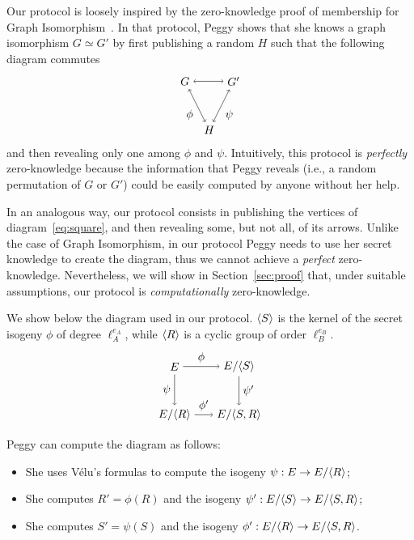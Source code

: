 Our protocol is loosely inspired by the zero-knowledge proof of
membership for Graph
Isomorphism~\cite{goldreich+micali+widgerson91}. In that protocol,
Peggy shows that she knows a graph isomorphism $G \simeq G'$ by first
publishing a random $H$ such that the following diagram commutes
\begin{equation}
  \label{eq:gi}
  \begin{tikzpicture}[xscale=1.5,yscale=1.5,baseline=(current bounding box.east)]
    \node(G) at (0,0) {$G$};
    \node(G') at (1,0) {$G'$};
    \node(H) at (0.5,-1) {$H$};
    \path[<->] (G) edge (G');
    \path[<->] (G) edge node[auto,swap] {$\phi$} (H);
    \path[<->] (G') edge node[auto] {$\psi$} (H);
  \end{tikzpicture}  
\end{equation}
and then revealing only one among $\phi$ and $\psi$. Intuitively, this
protocol is \emph{perfectly} zero-knowledge because the information
that Peggy reveals (i.e., a random permutation of $G$ or $G'$) could
be easily computed by anyone without her help.

In an analogous way, our protocol consists in publishing the vertices
of diagram~\eqref{eq:square}, and then revealing some, but not all, of
its arrows. Unlike the case of Graph Isomorphism, in our protocol
Peggy needs to use her secret knowledge to create the diagram, thus we
cannot achieve a \emph{perfect} zero-knowledge. Nevertheless, we will
show in Section~\ref{sec:proof} that, under suitable assumptions, our
protocol is \emph{computationally} zero-knowledge.

We show below the diagram used in our protocol. ${\langle S \rangle}$ is the
kernel of the secret isogeny $\phi$ of degree $\ell_A^{e_A}$, while
${\langle R \rangle}$ is a cyclic group of order $\ell_B^{e_B}$.
\begin{equation}
  \label{eq:zk}
  \begin{tikzpicture}[xscale=2,yscale=1.5,baseline=(current bounding box.east)]
    \node(0) at (0,0) {$E$};
    \node(S) at (1,0) {$E/\cyc{S}$};
    \node(R) at (0,-1) {$E/\cyc{R}$};
    \node(SR) at (1,-1) {$E/\cyc{S,R}$};
    \path[->] (0) edge node[auto] {$\phi$} (S);
    \path[->] (0) edge node[auto,swap] {$\psi$} (R);
    \path[->] (S) edge node[auto] {$\psi'$} (SR);
    \path[->] (R) edge node[auto] {$\phi'$} (SR);
  \end{tikzpicture}
\end{equation}

Peggy can compute the diagram as follows:
\begin{itemize}
\item She uses V\'elu's formulas to compute the isogeny $\psi:E\to
  E/{\langle R \rangle}$;
\item She computes $R' = \phi(R)$ and the isogeny $\psi':E/{\langle S \rangle}\to
  E/{\langle S,R \rangle}$;
\item She computes $S' = \psi(S)$ and the isogeny
  $\phi':E/{\langle R \rangle}\to E/{\langle S,R \rangle}$.
\end{itemize}


